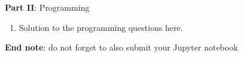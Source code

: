 \documentclass{article}
\begin{document}
\large{\textbf{Part II}: Programming}\normalsize

\begin{enumerate}[leftmargin=\labelsep,resume]
\item Solution to the programming questions here.
\end{enumerate}

\vskip 1cm
\textbf{End note}: do not forget to also submit your Jupyter notebook

\newpage

\end{document}
